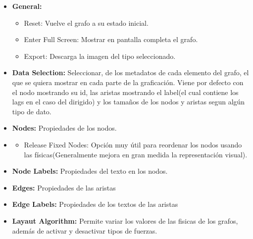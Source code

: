 \documentclass[spanish]{article}
\begin{document}
\begin{itemize}
    \item \textbf{General:}
    \begin{itemize}
        \item Reset: Vuelve el grafo a su estado inicial.
        \item Enter Full Screen: Mostrar en pantalla completa el grafo.
        \item Export: Descarga la imagen del tipo seleccionado.
    \end{itemize}
    \item \textbf{Data Selection:} Seleccionar, de los metadatos de cada elemento del grafo, el que se quiera mostrar en cada parte de la graficación. Viene por defecto con el nodo mostrando su id, las aristas mostrando el label(el cual contiene los lags en el caso del dirigido) y los tamaños de los nodos y aristas segun algún tipo de dato.
    \item \textbf{Nodes:} Propiedades de los nodos.
    \item \begin{itemize}
        \item Release Fixed Nodes: Opción muy útil para reordenar los nodos usando las físicas(Generalmente mejora en gran medida la representación visual).
    \end{itemize}
    \item \textbf{Node Labels:} Propiedades del texto en los nodos.
    \item \textbf{Edges:} Propiedades de las aristas
    \item \textbf{Edge Labels:} Propiedades de los textos de las aristas
    \item \textbf{Layaut Algorithm:} Permite variar los valores de las fisicas de los grafos, además de activar y desactivar tipos de fuerzas.
\end{itemize}

\end{document}
